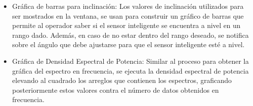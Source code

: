 \begin{itemize}
    \item Gráfica de barras para inclinación: Los valores de inclinación utilizados para ser mostrados en la ventana, se usan para construir un gráfico de barras que permite al operador saber si el sensor inteligente se encuentra a nivel en un rango dado. Además, en caso de no estar dentro del rango deseado, se notifica sobre el ángulo que debe ajustarse para que el sensor inteligente esté a nivel.
    
    \item Gráfica de Densidad Espectral de Potencia: Similar al proceso para obtener la gráfica del espectro en frecuencia, se ejecuta la densidad espectral de potencia elevando al cuadrado los arreglos que contienen los espectros, graficando posteriormente estos valores contra el número de datos obtenidos en frecuencia.
\end{itemize}



